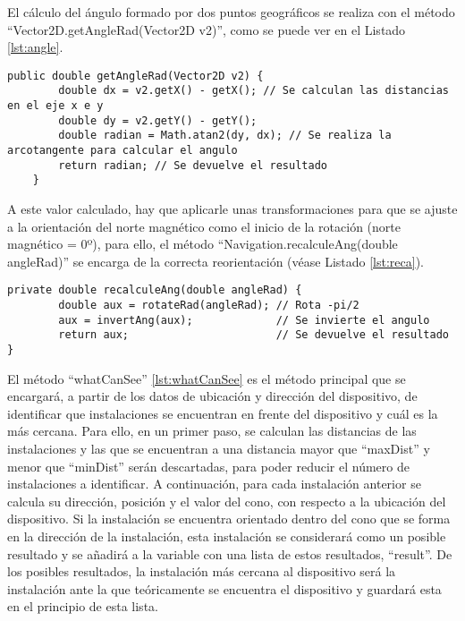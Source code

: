 El cálculo del ángulo formado por dos puntos geográficos se realiza con el método ``Vector2D.getAngleRad(Vector2D v2)'', como se puede ver en el Listado \ref{lst:angle}.

\begin{lstlisting}[caption={Método que calcula el ángulo formado por dos puntos.}, label={lst:angle}]
    public double getAngleRad(Vector2D v2) {
        double dx = v2.getX() - getX(); // Se calculan las distancias en el eje x e y
        double dy = v2.getY() - getY();
        double radian = Math.atan2(dy, dx); // Se realiza la arcotangente para calcular el angulo
        return radian; // Se devuelve el resultado
    }
\end{lstlisting}

A este valor calculado, hay que aplicarle unas transformaciones para que se ajuste a la orientación del norte magnético como el inicio de la rotación (norte magnético = 0º), para ello, el método ``Navigation.recalculeAng(double angleRad)'' se encarga de la correcta reorientación (véase Listado \ref{lst:reca}). 

\begin{lstlisting}[caption={Método que recalcula en ángulo para orientarlo en función del norte magnético.}, label={lst:reca}]
    private double recalculeAng(double angleRad) {
        double aux = rotateRad(angleRad); // Rota -pi/2
        aux = invertAng(aux);             // Se invierte el angulo 
        return aux;                       // Se devuelve el resultado
}   
\end{lstlisting}

El método ``whatCanSee'' \ref{lst:whatCanSee} es el método principal que se encargará, a partir de los datos de ubicación y dirección del dispositivo, de identificar que instalaciones se encuentran en frente del dispositivo y cuál es la más cercana. Para ello, en un primer paso, se calculan las distancias de las  instalaciones y las que se encuentran a una distancia mayor que ``maxDist'' y menor que ``minDist'' serán descartadas, para poder reducir el número de instalaciones a identificar. A continuación, para cada instalación anterior se calcula su dirección, posición y el valor del cono, con respecto a la ubicación del dispositivo. Si la instalación se encuentra orientado dentro del cono que se forma en la dirección de la instalación, esta instalación se considerará como un posible resultado y se añadirá a la variable con una lista de estos resultados, ``result''. De los posibles resultados, la instalación más cercana al dispositivo será la instalación ante la que teóricamente se encuentra el dispositivo y guardará esta en el principio de esta lista.
 
